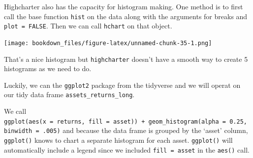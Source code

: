 \documentclass[]{krantz}
\makeatletter
\newenvironment{Shaded}{\begin{snugshade}}{\end{snugshade}}
\newcommand{\KeywordTok}[1]{\textcolor[rgb]{0.13,0.29,0.53}{\textbf{#1}}}
\newcommand{\DataTypeTok}[1]{\textcolor[rgb]{0.13,0.29,0.53}{#1}}
\newcommand{\DecValTok}[1]{\textcolor[rgb]{0.00,0.00,0.81}{#1}}
\newcommand{\FloatTok}[1]{\textcolor[rgb]{0.00,0.00,0.81}{#1}}
\newcommand{\StringTok}[1]{\textcolor[rgb]{0.31,0.60,0.02}{#1}}
\newcommand{\OtherTok}[1]{\textcolor[rgb]{0.56,0.35,0.01}{#1}}
\newcommand{\OperatorTok}[1]{\textcolor[rgb]{0.81,0.36,0.00}{\textbf{#1}}}
\newcommand{\NormalTok}[1]{#1}
\newenvironment{kframe}{%
\medskip{}
\setlength{\fboxsep}{.8em}
 \def\at@end@of@kframe{}%
 \ifinner\ifhmode%
  \def\at@end@of@kframe{\end{minipage}}%
  \begin{minipage}{\columnwidth}%
 \fi\fi%
 \def\FrameCommand##1{\hskip\@totalleftmargin \hskip-\fboxsep
 \colorbox{shadecolor}{##1}\hskip-\fboxsep
     \hskip-\linewidth \hskip-\@totalleftmargin \hskip\columnwidth}%
 \MakeFramed {\advance\hsize-\width
   \@totalleftmargin\z@ \linewidth\hsize
   \@setminipage}}%
 {\par\unskip\endMakeFramed%
 \at@end@of@kframe}
\renewenvironment{Shaded}{\begin{kframe}}{\end{kframe}}
\makeatother
\begin{document}
Highcharter also has the capacity for histogram making. One method is to
first call the base function \texttt{hist} on the data along with the
arguments for breaks and \texttt{plot\ =\ FALSE}. Then we can call
\texttt{hchart} on that object.

\begin{Shaded}
\end{Shaded}

\texttt{[image: bookdown\_files/figure-latex/unnamed-chunk-35-1.png]}

That's a nice histogram but \texttt{highcharter} doesn't have a smooth
way to create 5 histograms as we need to do.

Luckily, we can the \texttt{ggplot2} package from the tidyverse and we
will operat on our tidy data frame \texttt{assets\_returns\_long}.

We call
\texttt{ggplot(aes(x\ =\ returns,\ fill\ =\ asset))\ +\ geom\_histogram(alpha\ =\ 0.25,\ binwidth\ =\ .005)}
and because the data frame is grouped by the `asset' column,
\texttt{ggplot()} knows to chart a separate histogram for each asset.
\texttt{ggplot()} will automatically include a legend since we included
\texttt{fill\ =\ asset} in the \texttt{aes()} call.

\begin{Shaded}
\end{Shaded}
\end{document}
